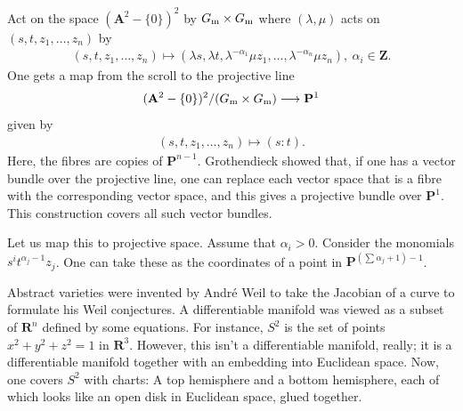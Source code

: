 \documentclass [11 pt, oneside] {article}
\begin{document}
\begin{example}[Scrolls]\label{}
Act on the space $(\mathbf{A}^2-\{0\})^2$ by $G\textsubscript{m}\times G\textsubscript{m}$ where $(\lambda,\mu)$ acts on $(s,t,z_1,\hdots, z_n)$ by 
\begin{align*}
	(s,t,z_1,\hdots,z_n)\longmapsto  (\lambda s, \lambda t, \lambda^{-\alpha_1}\mu z_1,\hdots, \lambda^{-\alpha_n}\mu z_n), \ \alpha_i\in \mathbf{Z}.
\end{align*}
One gets a map from the scroll to the projective line
\begin{align*}
	{(\mathbf{A}^2-\{0\})^2}/({G\textsubscript{m}\times G\textsubscript{m}}) \longrightarrow \mathbf{P}^1
\end{align*}
given by
\begin{align*}
	(s,t,z_1,\hdots, z_n) \longmapsto (s:t).
\end{align*}
Here, the fibres are copies of $\mathbf{P}^{n-1}$. Grothendieck showed that, if one has a vector bundle over the projective line,  one can replace each vector space that is a fibre with the corresponding vector space, and this gives a projective bundle over $\mathbf{P}^1$. This construction covers all such vector bundles.

Let us map this to projective space. Assume that $\alpha_i>0$. Consider the monomials $s^it^{\alpha_j-1}z_j$. One can take these as the coordinates of a point in $\mathbf{P}^{\left( \sum_{}^{} \alpha_j+1 \right) - 1}$.
\end{example}

Abstract varieties were invented by Andr\'e Weil to take the Jacobian of a curve to formulate his Weil conjectures. A differentiable manifold was viewed as a subset of $\mathbf{R}^n$ defined by some equations. For instance, $S^2$ is the set of points $x^2+y^2+z^2=1$ in $\mathbf{R}^3$. However, this isn't a differentiable manifold, really; it is a differentiable manifold together with an embedding into Euclidean space. Now, one covers $S^2$ with charts: A top hemisphere and a bottom hemisphere, each of which looks like an open disk in Euclidean space, glued together. 
\end{document}
